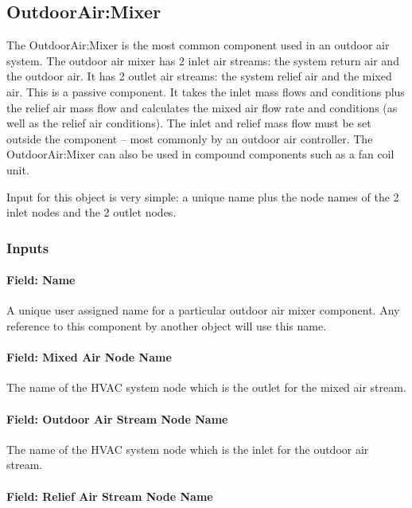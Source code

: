\subsection{OutdoorAir:Mixer}\label{outdoorairmixer}

The OutdoorAir:Mixer is the most common component used in an outdoor air system. The outdoor air mixer has 2 inlet air streams: the system return air and the outdoor air. It has 2 outlet air streams: the system relief air and the mixed air. This is a passive component. It takes the inlet mass flows and conditions plus the relief air mass flow and calculates the mixed air flow rate and conditions (as well as the relief air conditions). The inlet and relief mass flow must be set outside the component -- most commonly by an outdoor air controller. The OutdoorAir:Mixer can also be used in compound components such as a fan coil unit.

Input for this object is very simple: a unique name plus the node names of the 2 inlet nodes and the 2 outlet nodes.

\subsubsection{Inputs}\label{inputs-7-001}

\paragraph{Field: Name}\label{field-name-6-001}

A unique user assigned name for a particular outdoor air mixer component. Any reference to this component by another object will use this name.

\paragraph{Field: Mixed Air Node Name}\label{field-mixed-air-node-name}

The name of the HVAC system node which is the outlet for the mixed air stream.

\paragraph{Field: Outdoor Air Stream Node Name}\label{field-outdoor-air-stream-node-name}

The name of the HVAC system node which is the inlet for the outdoor air stream.

\paragraph{Field: Relief Air Stream Node Name}\label{field-relief-air-stream-node-name}

